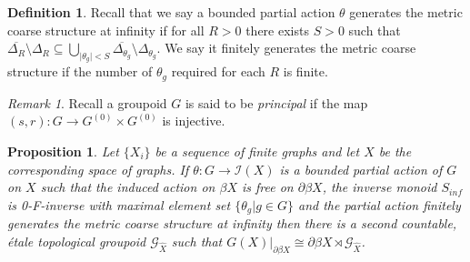 \documentclass[11pt]{amsart}
\theoremstyle{plain}
\newtheorem{proposition}[theorem]{Proposition}%
\theoremstyle{definition}%
\newtheorem{definition}[theorem]{Definition}%
\theoremstyle{remark}%
\newtheorem{remark}[theorem]{Remark}%
\newcommand{\G}{\mathcal{G}}
\begin{document}
\begin{definition}
Recall that we say a bounded partial action  $\theta$ generates the metric coarse structure at infinity if for all $R>0$ there exists $S>0$ such that $\overline{\Delta_{R}}\setminus \Delta_{R} \subseteq \bigcup_{\vert \theta_{g} \vert < S}\overline{\Delta_{\theta_{g}}}\setminus \Delta_{\theta_{g}}$. We say it finitely generates the metric coarse structure if the number of $\theta_{g}$ required for each $R$ is finite.
\end{definition}

\begin{remark}
Recall a groupoid $G$ is said to be \textit{principal} if the map $(s,r): G \rightarrow G^{(0)}\times G^{(0)}$ is injective.
\end{remark}

\begin{proposition}\label{Prop:Aug}
Let $\lbrace X_{i} \rbrace$ be a sequence of finite graphs and let $X$ be the corresponding space of graphs. If $\theta:G \rightarrow \mathcal{I}(X)$ is a bounded partial action of $G$ on $X$ such that the induced action on $\beta X$ is free on $\partial \beta X$, the inverse monoid $S_{inf}$ is 0-F-inverse with maximal element set $\lbrace \theta_{g} |g \in G\rbrace$ and the partial action finitely generates the metric coarse structure at infinity then there is a second countable, \'etale topological groupoid $\G_{\widehat{X}}$ such that $G(X)|_{\partial\beta X} \cong \partial\beta X \rtimes \G_{\widehat{X}}$.
\end{proposition}
\end{document}
